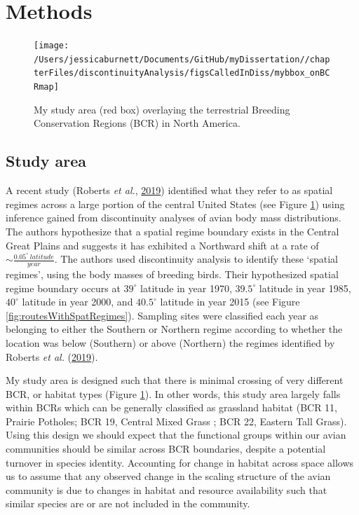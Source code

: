 \documentclass[12pt,twoside,openany]{reedthesis}
\begin{document}
\hypertarget{methods-2}{%
\section{Methods}\label{methods-2}}
\begin{figure}[bth]

{\centering \texttt{[image: /Users/jessicaburnett/Documents/GitHub/myDissertation//chapterFiles/discontinuityAnalysis/figsCalledInDiss/mybbox\_onBCRmap]} 

}

\caption{My study area (red box) overlaying the terrestrial Breeding Conservation Regions (BCR) in North America.}\label{fig:studyarea}
\end{figure}
\hypertarget{study-area-1}{%
\subsection{Study area}\label{study-area-1}}

A recent study (Roberts \emph{et al.}, \protect\hyperlink{ref-roberts2019shifting}{2019}) identified what they refer to as spatial regimes across a large portion of the central United States (see Figure \ref{fig:studyarea}) using inference gained from discontinuity analyses of avian body mass distributions. The authors hypothesize that a spatial regime boundary exists in the Central Great Plains and suggests it has exhibited a Northward shift at a rate of \(\sim\frac{0.05^\circ\ latitude}{year}\). The authors used discontinuity analysis to identify these `spatial regimes', using the body masses of breeding birds. Their hypothesized spatial regime boundary occurs at \(39^\circ\) latitude in year 1970, \(39.5^\circ\) latitude in year 1985, \(40^\circ\) latitude in year 2000, and \(40.5^\circ\) latitude in year 2015 (see Figure \ref{fig:routesWithSpatRegimes}). Sampling sites were classified each year as belonging to either the Southern or Northern regime according to whether the location was below (Southern) or above (Northern) the regimes identified by Roberts \emph{et al.} (\protect\hyperlink{ref-roberts2019shifting}{2019}).

My study area is designed such that there is minimal crossing of very different BCR, or habitat types (Figure \ref{fig:studyarea}). In other words, this study area largely falls within BCRs which can be generally classified as grassland habitat (BCR 11, Prairie Potholes; BCR 19, Central Mixed Grass ; BCR 22, Eastern Tall Grass). Using this design we should expect that the functional groups within our avian communities should be similar across BCR boundaries, despite a potential turnover in species identity. Accounting for change in habitat across space allows us to assume that any observed change in the scaling structure of the avian community is due to changes in habitat and resource availability such that similar species are or are not included in the community.
\end{document}
